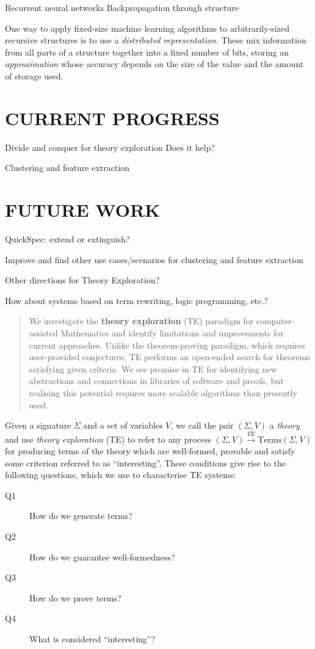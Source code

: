 \documentclass[]{article}
\begin{document}
Recurrent neural networks
Backpropagation through structure

One way to apply fixed-size machine learning algorithms to arbitrarily-sized recursive structures is to use a \emph{distributed representation}. These mix information from all parts of a structure together into a fixed number of bits, storing an \emph{approximation} whose accuracy depends on the size of the value and the amount of storage used.

\section{CURRENT PROGRESS}
\label{current}

Divide and conquer for theory exploration
Does it help?

Clustering and feature extraction

\section{FUTURE WORK}
\label{future}

QuickSpec: extend or extinguish?

Improve and find other use cases/scenarios for clustering and feature extraction

Other directions for Theory Exploration?

How about systems based on term rewriting, logic programming, etc.?

\begin{abstract}
We investigate the \textbf{theory exploration} (TE)
paradigm for computer-assisted Mathematics and identify limitations and
improvements for current approaches. Unlike the theorem-proving paradigm,
which requires user-provided conjectures, TE performs an open-ended
search for theorems satisfying given criteria. We see promise in TE for
identifying new abstractions and connections in libraries of software
and proofs, but realising this potential requires more scalable
algorithms than presently used.
\end{abstract}

Given a signature $\Sigma$ and a set of variables $V$, we call the pair
$(\Sigma, V)$ a \emph{theory} and use \emph{theory exploration} (TE) to refer
to any process $(\Sigma, V) \overset{TE}{\rightarrow} \text{Terms}(\Sigma, V)$
for producing terms of the theory which are well-formed, provable and satisfy
some criterion referred to as ``interesting''. These conditions give rise to the
following questions, which we use to characterise TE systems:
\begin{description}
\item [Q1] \label{Q1} How do we generate terms?
\item [Q2] \label{Q2} How do we guarantee well-formedness?
\item [Q3] \label{Q3} How do we prove terms?
\item [Q4] \label{Q4} What is considered ``interesting''?
\end{description}
\end{document}
